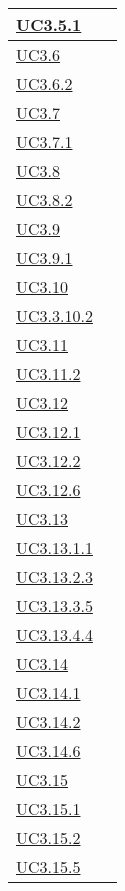 \begin{longtable}{|P{6cm}|P{6cm}|}
	\hline \hyperref[UC3.5.1]{UC3.5.1} &  \\
	\hline \hyperref[UC3.6]{UC3.6} &  \\
	\hline \hyperref[UC3.6.2]{UC3.6.2} &  \\
	\hline \hyperref[UC3.7]{UC3.7} &  \\
	\hline \hyperref[UC3.7.1]{UC3.7.1} &  \\
	\hline \hyperref[UC3.8]{UC3.8} &  \\
	\hline \hyperref[UC3.8.2]{UC3.8.2} &  \\
	\hline \hyperref[UC3.9]{UC3.9} &  \\
	\hline \hyperref[UC3.9.1]{UC3.9.1} &  \\
	\hline \hyperref[UC3.10]{UC3.10} &  \\
	\hline \hyperref[UC3.10.2]{UC3.3.10.2} &  \\
	\hline \hyperref[UC3.11]{UC3.11} &  \\
	\hline \hyperref[UC3.11.2]{UC3.11.2} &  \\
	\hline \hyperref[UC3.12]{UC3.12} &  \\
	\hline \hyperref[UC3.12.1]{UC3.12.1} &  \\
	\hline \hyperref[UC3.12.2]{UC3.12.2} &  \\
	\hline \hyperref[UC3.12.6]{UC3.12.6} &  \\
	\hline \hyperref[UC3.13]{UC3.13} &  \\
	\hline \hyperref[UC3.13.1.1]{UC3.13.1.1} &  \\
	\hline \hyperref[UC3.13.2.3]{UC3.13.2.3} &  \\
	\hline \hyperref[UC3.13.3.5]{UC3.13.3.5} &  \\
	\hline \hyperref[UC3.13.4.4]{UC3.13.4.4} &  \\
	\hline \hyperref[UC3.14]{UC3.14} &  \\
	\hline \hyperref[UC3.14.1]{UC3.14.1} &  \\
	\hline \hyperref[UC3.14.2]{UC3.14.2} &  \\
	\hline \hyperref[UC3.14.6]{UC3.14.6} &  \\
	\hline \hyperref[UC3.15]{UC3.15} &  \\
	\hline \hyperref[UC3.15.1]{UC3.15.1} &  \\
	\hline \hyperref[UC3.15.2]{UC3.15.2} &  \\
	\hline \hyperref[UC3.15.5]{UC3.15.5} &  \\
	\hline
\end{longtable}

